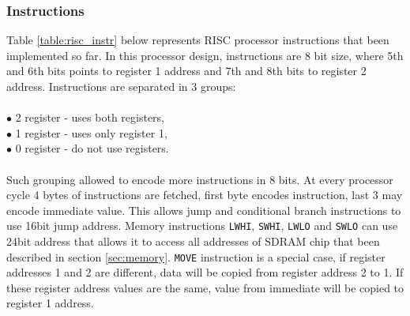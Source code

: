 \documentclass[a4paper,12pt]{article}
\begin{document}
\begin{multicols}{2}
\subsubsection{Instructions}\label{sec:instr}
Table \ref{table:risc_instr} below represents RISC processor instructions that been implemented so far. In this processor design, instructions are 8 bit size, where 5th and 6th bits points to register 1 address and 7th and 8th bits to register 2 address. Instructions are separated in 3 groups:\\\\
$\bullet$ 2 register - uses both registers,\\
$\bullet$ 1 register - uses only register 1,\\
$\bullet$ 0 register - do not use registers.\\\\
Such grouping allowed to encode more instructions in 8 bits. At every processor cycle 4 bytes of instructions are fetched, first byte encodes instruction, last 3 may encode immediate value. This allows jump and conditional branch instructions to use 16bit jump address. Memory instructions \texttt{LWHI}, \texttt{SWHI},  \texttt{LWLO} and \texttt{SWLO} can use 24bit address that allows it to access all addresses of SDRAM chip that been described in section \ref{sec:memory}. \texttt{MOVE} instruction is a special case, if register addresses 1 and 2 are different, data will be copied from register address 2 to 1. If these register address values are the same, value from immediate will be copied to register 1 address.

\end{multicols}
\end{document}
